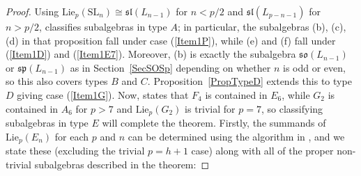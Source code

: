 \documentclass[11pt,a4paper,reqno]{amsart}
\theoremstyle{definition}
\numberwithin{equation}{section}
\newcommand{\fsl}{\mathfrak{sl}}
\newcommand{\fso}{\mathfrak{so}}
\newcommand{\fsp}{\mathfrak{sp}}
\newcommand{\Lie}{\mathrm{Lie}}
\newcommand{\SL}{\mathrm{SL}}
\begin{document}
\begin{proof}
Using $\Lie_p(\SL_n)\cong\fsl(L_{n-1})$ for $n<p/2$ and $\fsl(L_{p-n-1})$ for $n>p/2$, \cite[Proposition~4.2.2]{CEN} classifies subalgebras in type $A$; in particular, the subalgebras (b), (c), (d) in that proposition fall under case (\ref{Item1P}), while (e) and (f) fall under (\ref{Item1D}) and (\ref{Item1E7}). Moreover, (b) is exactly the subalgebra $\fso(L_{n-1})$ or $\fsp(L_{n-1})$ as in Section~\ref{SecSOSp} depending on whether $n$ is odd or even, so this also covers types $B$ and $C$. Proposition~\ref{PropTypeD} extends this to type $D$ giving case (\ref{Item1G}). Now, \cite[Theorem~6.4]{EO} states that $F_4$ is contained in $E_6$, while $G_2$ is contained in $A_6$ for $p>7$ and $\Lie_p(G_2)$ is trivial for $p=7$, so classifying subalgebras in type $E$ will complete the theorem. Firstly, the summands of $\Lie_p(E_n)$ for each $p$ and $n$ can be determined using the algorithm in \cite[\S3.2.3]{CEN}, and we state these (excluding the trivial $p=h+1$ case) along with all of the proper non-trivial subalgebras described in the theorem:


\end{proof}
\end{document}
